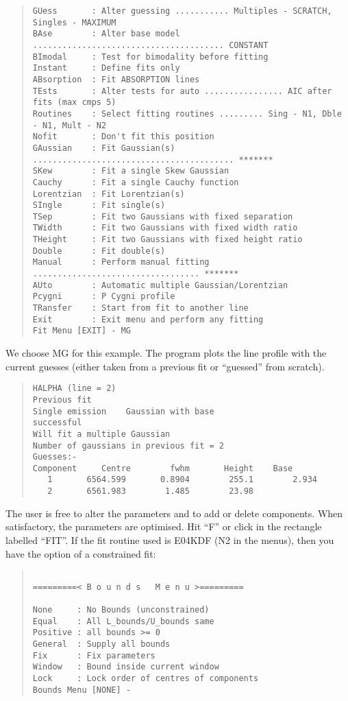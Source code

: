 \begin{quote}
\begin{verbatim}
GUess       : Alter guessing ........... Multiples - SCRATCH, Singles - MAXIMUM
BAse        : Alter base model ....................................... CONSTANT
BImodal     : Test for bimodality before fitting
Instant     : Define fits only
ABsorption  : Fit ABSORPTION lines
TEsts       : Alter tests for auto ................ AIC after fits (max cmps 5)
Routines    : Select fitting routines ......... Sing - N1, Dble - N1, Mult - N2
Nofit       : Don't fit this position
GAussian    : Fit Gaussian(s) ......................................... *******
SKew        : Fit a single Skew Gaussian
Cauchy      : Fit a single Cauchy function
Lorentzian  : Fit Lorentzian(s)
SIngle      : Fit single(s)
TSep        : Fit two Gaussians with fixed separation
TWidth      : Fit two Gaussians with fixed width ratio
THeight     : Fit two Gaussians with fixed height ratio
Double      : Fit double(s)
Manual      : Perform manual fitting .................................. *******
AUto        : Automatic multiple Gaussian/Lorentzian
Pcygni      : P Cygni profile
TRansfer    : Start from fit to another line
Exit        : Exit menu and perform any fitting
Fit Menu [EXIT] - MG
\end{verbatim}\end{quote}
We choose MG for this example. The program plots the line profile with
the current guesses (either taken from a previous fit or ``guessed''
from scratch).
\begin{quote}\begin{verbatim}
HALPHA (line = 2)
Previous fit
Single emission    Gaussian with base
successful
Will fit a multiple Gaussian
Number of gaussians in previous fit = 2
Guesses:-
Component     Centre        fwhm       Height    Base
   1       6564.599       0.8904        255.1        2.934
   2       6561.983        1.485        23.98
\end{verbatim}\end{quote}
The user is free to alter the parameters and to add or delete
components. When satisfactory, the parameters are optimised. Hit ``F''
or click in the rectangle labelled ``FIT''. If the fit routine used is
E04KDF (N2 in the menus), then you have the option of a constrained fit:
\begin{quote}\begin{verbatim}

=========< B o u n d s   M e n u >=========

None     : No Bounds (unconstrained)
Equal    : All L_bounds/U_bounds same
Positive : all bounds >= 0
General  : Supply all bounds
Fix      : Fix parameters
Window   : Bound inside current window
Lock     : Lock order of centres of components
Bounds Menu [NONE] -
\end{verbatim}\end{quote}
